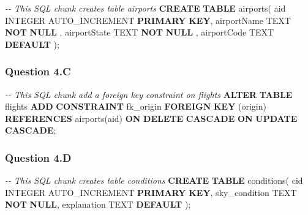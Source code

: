 \documentclass[
]{article}
\newenvironment{Shaded}{\begin{snugshade}}{\end{snugshade}}
\newcommand{\CommentTok}[1]{\textcolor[rgb]{0.56,0.35,0.01}{\textit{#1}}}
\newcommand{\DataTypeTok}[1]{\textcolor[rgb]{0.13,0.29,0.53}{#1}}
\newcommand{\KeywordTok}[1]{\textcolor[rgb]{0.13,0.29,0.53}{\textbf{#1}}}
\newcommand{\NormalTok}[1]{#1}
\newcommand{\StringTok}[1]{\textcolor[rgb]{0.31,0.60,0.02}{#1}}
\begin{document}
\begin{Shaded}
\begin{Highlighting}[]
\CommentTok{{-}{-} This SQL chunk creates table airports}
\KeywordTok{CREATE} \KeywordTok{TABLE}\NormalTok{ airports(}
\NormalTok{aid }\DataTypeTok{INTEGER}\NormalTok{ AUTO\_INCREMENT }\KeywordTok{PRIMARY} \KeywordTok{KEY}\NormalTok{,}
\NormalTok{airportName TEXT }\KeywordTok{NOT} \KeywordTok{NULL}\NormalTok{ ,}
\NormalTok{airportState TEXT }\KeywordTok{NOT} \KeywordTok{NULL}\NormalTok{ ,}
\NormalTok{airportCode TEXT }\KeywordTok{DEFAULT} \StringTok{\textquotesingle{}\textquotesingle{}}
\NormalTok{);}
\end{Highlighting}
\end{Shaded}

\hypertarget{question-4.c}{%
\subsubsection{Question 4.C}\label{question-4.c}}

\begin{Shaded}
\begin{Highlighting}[]
\CommentTok{{-}{-} This SQL chunk add a foreign key constraint on flights}
\KeywordTok{ALTER} \KeywordTok{TABLE}\NormalTok{ flights}
\KeywordTok{ADD} \KeywordTok{CONSTRAINT}\NormalTok{ fk\_origin}
\KeywordTok{FOREIGN} \KeywordTok{KEY}\NormalTok{ (origin) }\KeywordTok{REFERENCES}\NormalTok{ airports(aid)}
\KeywordTok{ON} \KeywordTok{DELETE} \KeywordTok{CASCADE}
\KeywordTok{ON} \KeywordTok{UPDATE} \KeywordTok{CASCADE}\NormalTok{;}
\end{Highlighting}
\end{Shaded}

\hypertarget{question-4.d}{%
\subsubsection{Question 4.D}\label{question-4.d}}

\begin{Shaded}
\begin{Highlighting}[]
\CommentTok{{-}{-} This SQL chunk creates table conditions}
\KeywordTok{CREATE} \KeywordTok{TABLE}\NormalTok{ conditions(}
\NormalTok{cid }\DataTypeTok{INTEGER}\NormalTok{ AUTO\_INCREMENT }\KeywordTok{PRIMARY} \KeywordTok{KEY}\NormalTok{,}
\NormalTok{sky\_condition TEXT }\KeywordTok{NOT} \KeywordTok{NULL}\NormalTok{,}
\NormalTok{explanation TEXT }\KeywordTok{DEFAULT} \StringTok{\textquotesingle{}\textquotesingle{}}
\NormalTok{);}
\end{Highlighting}
\end{Shaded}
\end{document}
